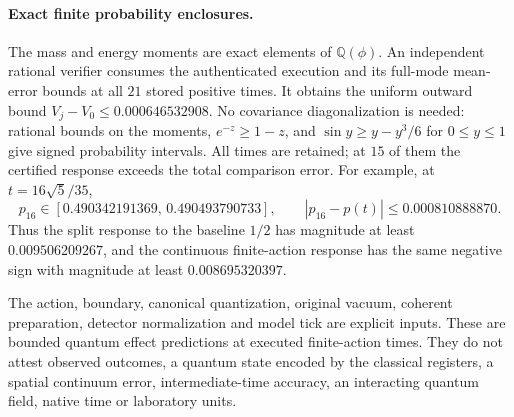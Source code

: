 \paragraph{Exact finite probability enclosures.}
The mass and energy moments are exact elements of $\mathbb Q(\phi)$.
An independent rational verifier consumes the authenticated execution and
its full-mode mean-error bounds at all $21$ stored positive times.
It obtains the uniform outward bound $V_j-V_0\le0.000646532908$.
No covariance diagonalization is needed: rational bounds on the moments,
$e^{-z}\ge1-z$, and $\sin y\ge y-y^3/6$ for $0\le y\le1$
give signed probability intervals. All times are retained; at $15$ of them
the certified response exceeds the total comparison error.
For example, at $t=16\sqrt5/35$,
\[
 p_{16}\in[0.490342191369,\,0.490493790733],\qquad
 |p_{16}-p(t)|\le0.000810888870.
\]
Thus the split response to the baseline $1/2$ has magnitude at least
$0.009506209267$, and the continuous finite-action response has the same
negative sign with magnitude at least $0.008695320397$.

The action, boundary, canonical quantization, original vacuum, coherent
preparation, detector normalization and model tick are explicit inputs.
These are bounded quantum effect predictions at executed finite-action
times. They do not attest observed outcomes, a quantum state encoded by
the classical registers, a spatial continuum error, intermediate-time
accuracy, an interacting quantum field, native time or laboratory units.
